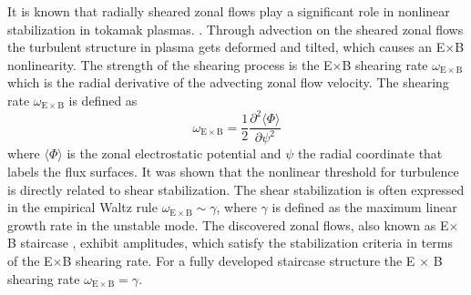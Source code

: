 \documentclass[aip, amsmath, amssymb, reprint, twocolumn]{revtex4-1}
\begin{document}


It is known that radially sheared zonal flows play a significant role in nonlinear stabilization in tokamak plasmas. \cite{WACooper1988,doi:10.1063/1.859529,doi:10.1063/1.873896}. 
Through advection on the sheared zonal flows the turbulent structure in plasma gets deformed and tilted, which causes an E$\times$B nonlinearity. \cite{doi:10.1063/1.859529, doi:10.1063/1.871313, doi:10.1063/1.872367}
The strength of the shearing process is the E$\times$B shearing rate $\omega_{\mathrm{E \times B}}$ which is the radial derivative of the advecting zonal flow velocity. \cite{doi:10.1063/1.871313, doi:10.1063/1.872847}
The shearing rate $\omega_{\mathrm{E \times B}}$ is defined as 
\begin{equation}
	\omega_{\mathrm{E \times B}} = \frac{1}{2} \frac{\partial^2 \langle \Phi \rangle}{\partial \psi^2}
	\label{eq:shearingrate}
\end{equation}
where $\langle \Phi \rangle$ is the zonal electrostatic potential and $\psi$ the radial coordinate that labels the flux surfaces. \cite{doi:10.1063/1.4952621, doi:10.1063/1.3005380}
It was shown that the nonlinear threshold for turbulence is directly related to shear stabilization. \cite{doi:10.1063/1.873896} 
The shear stabilization is often expressed in the empirical Waltz rule $\omega_{\mathrm{E \times B}} \sim \gamma$, \cite{doi:10.1063/1.870934, doi:10.1063/1.872847} where $\gamma$ is defined as the maximum linear growth rate in the unstable mode. The discovered zonal flows, also known as E$\times$B staircase \cite{PhysRevE.82.025401}, exhibit amplitudes, which satisfy the stabilization criteria in terms of the E$\times$B shearing rate. For a fully developed staircase structure the E $\times$ B shearing rate $\omega_{\mathrm{E \times B}} = \gamma$. \cite{doi:10.1063/1.4961231, doi:10.1063/1.4952621}\bigskip
\end{document}
